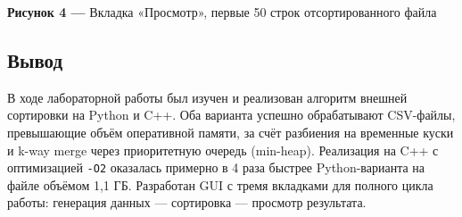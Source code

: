 \documentclass[oneside,a4paper,14pt]{extarticle}
\begin{document}
    \textbf{Рисунок 4 --- }Вкладка «Просмотр», первые 50 строк отсортированного файла

\begin{flushleft}
\newpage
\section*{Вывод}
\noindent
В ходе лабораторной работы был изучен и реализован алгоритм внешней сортировки на Python и C++. Оба варианта успешно обрабатывают CSV-файлы, превышающие объём оперативной памяти, за счёт разбиения на временные куски и k-way merge через приоритетную очередь (min-heap). Реализация на C++ с оптимизацией \texttt{-O2} оказалась примерно в 4 раза быстрее Python-варианта на файле объёмом 1,1 ГБ. Разработан GUI с тремя вкладками для полного цикла работы: генерация данных --- сортировка --- просмотр результата.
\end{flushleft}
\end{document}
